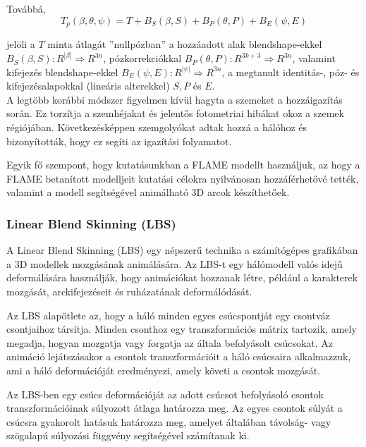 \documentclass[12pt,a4]{article}
\begin{document}
                Továbbá, 
                \begin{equation*}
                    T_{p}(\beta, \theta, \psi) = T + B_{S}(\beta, S) + B_{P}(\theta, P) + B_{E}(\psi, E)
                \end{equation*}

                jelöli a $T$ minta átlagát ”nullpózban” a hozzáadott alak blendshape-ekkel $B_{S} (\beta, S) : R^{|\beta|} \Rightarrow R^{3n}$, pózkorrekciókkal $B_{P}(\theta, P) : R^{3k+3} \Rightarrow R^{3n}$, valamint kifejezés blendshape-ekkel $B_{E}(\psi, E) : R^{|\psi|} \Rightarrow R^{3n}$, a megtanult identitás-, póz- és kifejezésalapokkal (lineáris alterekkel) $S, P$ és $E$. \\

                A legtöbb korábbi módszer figyelmen kívül hagyta a szemeket a
                hozzáigazítás során. Ez torzítja a szemhéjakat és jelentős fotometriai hibákat okoz a szemek régiójában. Következésképpen szemgolyókat adtak hozzá a hálóhoz és bizonyították, hogy ez segíti az igazítási folyamatot.

                Egyik fő szempont, hogy kutatásunkban a FLAME modellt használjuk, az hogy a FLAME betanított modelljeit kutatási célokra nyilvánosan hozzáférhetővé tették, valamint a modell segítségével animálható 3D arcok készíthetőek.

            \subsubsection{Linear Blend Skinning (LBS)}

                A Linear Blend Skinning (LBS) egy népszerű technika a számítógépes grafikában a 3D modellek mozgásának animálására. Az LBS-t egy hálómodell valós idejű deformálására használják, hogy animációkat hozzanak létre, például a karakterek mozgását, arckifejezéseit és ruházatának deformálódását.

                Az LBS alapötlete az, hogy a háló minden egyes csúcspontját egy csontváz csontjaihoz társítja. Minden csonthoz egy transzformációs mátrix tartozik, amely megadja, hogyan mozgatja vagy forgatja az általa befolyásolt csúcsokat. Az animáció lejátszásakor a csontok transzformációit a háló csúcsaira alkalmazzuk, ami a háló deformációját eredményezi, amely követi a csontok mozgását.
                
                Az LBS-ben egy csúcs deformációját az adott csúcsot befolyásoló csontok transzformációinak súlyozott átlaga határozza meg. Az egyes csontok súlyát a csúcsra gyakorolt hatásuk határozza meg, amelyet általában távolság- vagy szögalapú súlyozási függvény segítségével számítanak ki.
                
\end{document}
